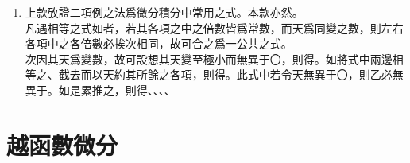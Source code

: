 \begin{enumerate} [label={第\chinese*款},nolistsep]
	\item 上款攷證二項例之法爲微分積分中常用之式。本款亦然。\\
	凡遇相等之式如\CJKmove {}者，若其各項之中之倍數皆爲常數，而天爲同變之數，則左右各項中之各倍數必挨次相同，故可合之爲一公共之式。\\
	次因其天爲變數，故可設想其天變至極小而無異于〇，則得\CJKmove。如將式中兩邊相等之\CJKmove、\CJKmove 截去而以天約其所餘之各項，則得\CJKmove。此式中若令天無異于〇，則乙必無異于。如是累推之，則得\CJKmove、\CJKmove、\CJKmove、\CJKmove、\CJKmove
\end{enumerate}

\section{越函數微分}

